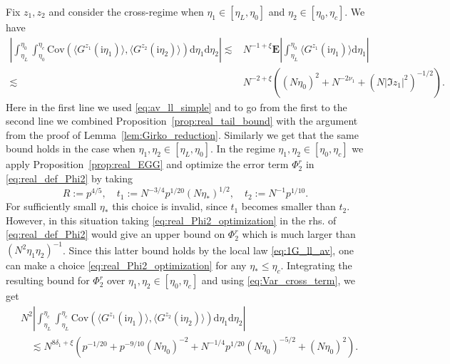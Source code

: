 \documentclass[10pt]{amsart}
\numberwithin{equation}{section}
\newcommand{\dif}{\mathrm{d}}
\newcommand{\E}{\mathbf{E}}
\newcommand{\ii}{\mathrm{i}}
\begin{document}
Fix $z_1,z_2$ and consider the cross-regime when $\eta_1\in [\eta_L,\eta_0]$ and $\eta_2\in [\eta_0,\eta_c]$. We have
\begin{equation}
\begin{split}
\left\vert\int_{\eta_L}^{\eta_0}\int_{\eta_0}^{\eta_c} \mathrm{Cov}\left(\langle G^{z_1}(\ii\eta_1)\rangle, \langle G^{z_2}(\ii\eta_2)\rangle\right)\dif\eta_1\dif\eta_2\right\vert \lesssim &N^{-1+\xi} \E \left\vert\int_{\eta_L}^{\eta_0}\langle G^{z_1}(\ii\eta_1)\rangle\dif \eta_1\right\vert \\
\lesssim &N^{-2+\xi}\left((N\eta_0)^2+N^{-2\nu_1} + \left(N|\Im z_1|^2\right)^{-1/2}\right).
\end{split}
\label{eq:Var_cross_term}
\end{equation}
Here in the first line we used \eqref{eq:av_ll_simple} and to go from the first to the second line we combined Proposition~\ref{prop:real_tail_bound} with the argument from the proof of Lemma~\ref{lem:Girko_reduction}. Similarly we get that the same bound holds in the case when $\eta_1,\eta_2\in [\eta_L,\eta_0]$. In the regime $\eta_1,\eta_2\in [\eta_0,\eta_c]$ we apply Proposition~\ref{prop:real_EGG} and optimize the error term $\Phi_2^r$ in \eqref{eq:real_def_Phi2} by taking
\begin{equation}
R:=p^{4/5},\quad t_1:=N^{-3/4}p^{1/20}(N\eta_*)^{1/2},\quad t_2:=N^{-1}p^{1/10}.
\label{eq:real_Phi2_optimization}
\end{equation}
For sufficiently small $\eta_*$ this choice is invalid, since $t_1$ becomes smaller than $t_2$. However, in this situation taking \eqref{eq:real_Phi2_optimization} in the rhs. of \eqref{eq:real_def_Phi2} would give an upper bound on 
$\Phi_2^r$ which is much larger than $(N^2\eta_1\eta_2)^{-1}$. Since this latter bound holds by the local law \eqref{eq:1G_ll_av}, one can make a choice \eqref{eq:real_Phi2_optimization} for any $\eta_*\le \eta_c$. 
Integrating the resulting bound for $\Phi_2^r$ over $\eta_1,\eta_2\in [\eta_0,\eta_c]$ and using \eqref{eq:Var_cross_term}, we get
\begin{equation}
\begin{split}
&N^2\left\vert\int_{\eta_L}^{\eta_c}\int_{\eta_L}^{\eta_c} \mathrm{Cov}\left(\langle G^{z_1}(\ii\eta_1)\rangle,\langle G^{z_2}(\ii\eta_2)\rangle\right)\dif \eta_1\dif\eta_2\right\vert\\
&\quad\lesssim N^{8\delta_1+\xi}\left(p^{-1/20} + p^{-9/10} (N\eta_0)^{-2} + N^{-1/4} p^{1/20}(N\eta_0)^{-5/2} +(N\eta_0)^2\right).
\end{split}
\label{eq:real_Var_ll_bound}
\end{equation}
\end{document}
